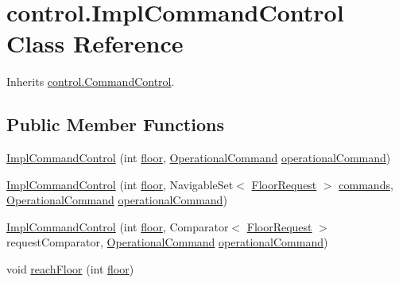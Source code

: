 \hypertarget{classcontrol_1_1_impl_command_control}{}\section{control.\+Impl\+Command\+Control Class Reference}
\label{classcontrol_1_1_impl_command_control}


Inherits \mbox{\hyperlink{interfacecontrol_1_1_command_control}{control.\+Command\+Control}}.

\subsection*{Public Member Functions}
\begin{DoxyCompactItemize}
\item 
\mbox{\hyperlink{classcontrol_1_1_impl_command_control_ae6bd16309a6cd954c9dd44244ed6cdd3}{Impl\+Command\+Control}} (int \mbox{\hyperlink{classcontrol_1_1_impl_command_control_acbd6195b1d21b55b2c9c96d144f98671}{floor}}, \mbox{\hyperlink{interfacecontrol_1_1_operational_command}{Operational\+Command}} \mbox{\hyperlink{classcontrol_1_1_impl_command_control_adbe2ee9057a11e4d2408947f5ff83cd5}{operational\+Command}})
\item 
\mbox{\hyperlink{classcontrol_1_1_impl_command_control_a57ac3479e6a08c522404266b3078db16}{Impl\+Command\+Control}} (int \mbox{\hyperlink{classcontrol_1_1_impl_command_control_acbd6195b1d21b55b2c9c96d144f98671}{floor}}, Navigable\+Set$<$ \mbox{\hyperlink{classcontrol_1_1command_1_1_floor_request}{Floor\+Request}} $>$ \mbox{\hyperlink{classcontrol_1_1_impl_command_control_afc3d3dfd36511a07dd41e717df3b13f9}{commands}}, \mbox{\hyperlink{interfacecontrol_1_1_operational_command}{Operational\+Command}} \mbox{\hyperlink{classcontrol_1_1_impl_command_control_adbe2ee9057a11e4d2408947f5ff83cd5}{operational\+Command}})
\item 
\mbox{\hyperlink{classcontrol_1_1_impl_command_control_a384f52aa39c3a5745b9143d6763e36a9}{Impl\+Command\+Control}} (int \mbox{\hyperlink{classcontrol_1_1_impl_command_control_acbd6195b1d21b55b2c9c96d144f98671}{floor}}, Comparator$<$ \mbox{\hyperlink{classcontrol_1_1command_1_1_floor_request}{Floor\+Request}} $>$ request\+Comparator, \mbox{\hyperlink{interfacecontrol_1_1_operational_command}{Operational\+Command}} \mbox{\hyperlink{classcontrol_1_1_impl_command_control_adbe2ee9057a11e4d2408947f5ff83cd5}{operational\+Command}})
\item 
void \mbox{\hyperlink{classcontrol_1_1_impl_command_control_a5736ac91cdc39805dc27c6af0c9935cb}{reach\+Floor}} (int \mbox{\hyperlink{classcontrol_1_1_impl_command_control_acbd6195b1d21b55b2c9c96d144f98671}{floor}})

\end{DoxyCompactItemize}
